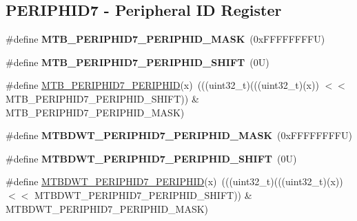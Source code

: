 \subsection*{P\+E\+R\+I\+P\+H\+I\+D7 -\/ Peripheral ID Register}
\begin{DoxyCompactItemize}
\item 
\mbox{\label{group___m_t_b___register___masks_ga1d4e4da0f3d1223a23af545276cea368}} 
\#define {\bfseries M\+T\+B\+\_\+\+P\+E\+R\+I\+P\+H\+I\+D7\+\_\+\+P\+E\+R\+I\+P\+H\+I\+D\+\_\+\+M\+A\+SK}~(0x\+F\+F\+F\+F\+F\+F\+F\+F\+U)
\item 
\mbox{\label{group___m_t_b___register___masks_ga9e856be0208ba9461b50de4a4a1982e0}} 
\#define {\bfseries M\+T\+B\+\_\+\+P\+E\+R\+I\+P\+H\+I\+D7\+\_\+\+P\+E\+R\+I\+P\+H\+I\+D\+\_\+\+S\+H\+I\+FT}~(0\+U)
\item 
\#define \mbox{\hyperlink{group___m_t_b___register___masks_ga0fda7c328e91db5ba6d182ad0b573390}{M\+T\+B\+\_\+\+P\+E\+R\+I\+P\+H\+I\+D7\+\_\+\+P\+E\+R\+I\+P\+H\+ID}}(x)~(((uint32\+\_\+t)(((uint32\+\_\+t)(x)) $<$$<$ M\+T\+B\+\_\+\+P\+E\+R\+I\+P\+H\+I\+D7\+\_\+\+P\+E\+R\+I\+P\+H\+I\+D\+\_\+\+S\+H\+I\+FT)) \& M\+T\+B\+\_\+\+P\+E\+R\+I\+P\+H\+I\+D7\+\_\+\+P\+E\+R\+I\+P\+H\+I\+D\+\_\+\+M\+A\+SK)
\item 
\mbox{\label{group___m_t_b___register___masks_gab91f1c8e7109af4dd71c9fab84ece4e4}} 
\#define {\bfseries M\+T\+B\+D\+W\+T\+\_\+\+P\+E\+R\+I\+P\+H\+I\+D7\+\_\+\+P\+E\+R\+I\+P\+H\+I\+D\+\_\+\+M\+A\+SK}~(0x\+F\+F\+F\+F\+F\+F\+F\+F\+U)
\item 
\mbox{\label{group___m_t_b___register___masks_gaa836402ed643b25f730532cae8072b7d}} 
\#define {\bfseries M\+T\+B\+D\+W\+T\+\_\+\+P\+E\+R\+I\+P\+H\+I\+D7\+\_\+\+P\+E\+R\+I\+P\+H\+I\+D\+\_\+\+S\+H\+I\+FT}~(0\+U)
\item 
\#define \mbox{\hyperlink{group___m_t_b___register___masks_gad29073f33066706ed4cf4264a244caf5}{M\+T\+B\+D\+W\+T\+\_\+\+P\+E\+R\+I\+P\+H\+I\+D7\+\_\+\+P\+E\+R\+I\+P\+H\+ID}}(x)~(((uint32\+\_\+t)(((uint32\+\_\+t)(x)) $<$$<$ M\+T\+B\+D\+W\+T\+\_\+\+P\+E\+R\+I\+P\+H\+I\+D7\+\_\+\+P\+E\+R\+I\+P\+H\+I\+D\+\_\+\+S\+H\+I\+FT)) \& M\+T\+B\+D\+W\+T\+\_\+\+P\+E\+R\+I\+P\+H\+I\+D7\+\_\+\+P\+E\+R\+I\+P\+H\+I\+D\+\_\+\+M\+A\+SK)
\item 

\end{DoxyCompactItemize}
